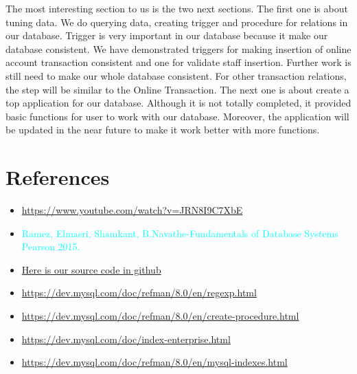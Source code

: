 \documentclass[12pt,a4paper]{article}
\begin{document}
The most interesting section to us is the two next sections. The first one is about tuning data. We do querying data, creating trigger and procedure for relations in our database. Trigger is very important in our database because it make our database consistent. We have demonstrated triggers for making insertion of online account transaction consistent and one for validate staff insertion. Further work is still need to make our whole database consistent. For other transaction relations, the step will be similar to the Online Transaction. The next one is about create a top application for our database. Although it is not totally completed, it provided basic functions for user to work with our database. Moreover, the application will be updated in the near future to make it work better with more functions.

\section{References}
\begin{itemize}
\item \href{https://www.youtube.com/watch?v=JRN8I9C7XbE&list=PLuji25yj7oIJ5JU
NOtgMZQJNWEBew7Tdo&index=10}{https://www.youtube.com/watch?v=JRN8I9C7XbE}
    \item \textcolor{cyan}{Ramez, Elmasri, Shamkant, B.Navathe-Fundamentals of Database Systems Pearson 2015.}
    \item \href{https://github.com/kietcaoc3a/bank_transaction/tree/main/bank_transaction/src/main/java/com/mycompany/bank_transaction}{Here is our source code in github}
    \item \href{https://dev.mysql.com/doc/refman/8.0/en/regexp.html}{https://dev.mysql.com/doc/refman/8.0/en/regexp.html}
    \item \href{https://dev.mysql.com/doc/refman/8.0/en/create-procedure.html}{https://dev.mysql.com/doc/refman/8.0/en/create-procedure.html}
    \item \href{https://dev.mysql.com/doc/index-enterprise.html}{https://dev.mysql.com/doc/index-enterprise.html}
    \item \href{https://dev.mysql.com/doc/refman/8.0/en/mysql-indexes.html}{https://dev.mysql.com/doc/refman/8.0/en/mysql-indexes.html}
\end{itemize}
    \textcolor{dfdf}{}
\end{document}
